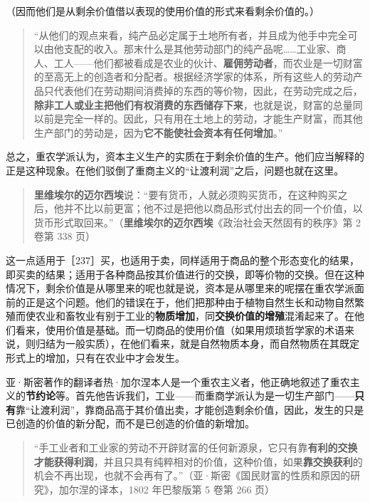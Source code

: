 （因而他们是从剩余价值借以表现的使用价值的形式来看剩余价值的。）

\begin{quote}“从他们的观点来看，纯产品必定属于土地所有者，并且成为他手中完全可以由他支配的收入。那末什么是其他劳动部门的纯产品呢……工业家、商人、工人——他们都被看成是农业的伙计、\textbf{雇佣劳动者}，而农业是一切财富的至高无上的创造者和分配者。根据经济学家的体系，所有这些人的劳动产品只代表他们在劳动期间消费掉的东西的等价物，因此，在劳动完成之后，\textbf{除非工人或业主把他们有权消费的东西储存下来}，也就是说，财富的总量同以前是完全一样的。因此，只有用在土地上的劳动，才能生产财富，而其他生产部门的劳动是，因为\textbf{它不能使社会资本有任何增加}。”\end{quote}

\fontbox{~\{}总之，重农学派认为，资本主义生产的实质在于剩余价值的生产。他们应当解释的正是这种现象。在他们驳倒了重商主义的“让渡利润”之后，问题也就在这里。

\begin{quote}\textbf{里维埃尔的迈尔西埃}说：“要有货币，人就必须购买货币，在这种购买之后，他并不比以前更富；他不过是把他以商品形式付出去的同一个价值，以货币形式取回来。”（\textbf{里维埃尔的迈尔西埃}《政治社会天然固有的秩序》第 2 卷第 338 页）\end{quote}

这一点适用于［237］买，也适用于卖，同样适用于商品的整个形态变化的结果，即买卖的结果；适用于各种商品按其价值进行的交换，即等价物的交换。但在这种情况下，剩余价值是从哪里来的呢也就是说，资本是从哪里来的呢摆在重农学派面前的正是这个问题。他们的错误在于，他们把那种由于植物自然生长和动物自然繁殖而使农业和畜牧业有别于工业的\textbf{物质增加}，同\textbf{交换价值的增殖}混淆起来了。在他们看来，使用价值是基础。而一切商品的使用价值（如果用烦琐哲学家的术语来说，则归结为一般实质），在他们看来，就是自然物质本身，而自然物质在其既定形式上的增加，只有在农业中才会发生。\fontbox{\}~}

亚·斯密著作的翻译者热·加尔涅本人是一个重农主义者，他正确地叙述了重农主义的\textbf{节约论}等。首先他告诉我们，工业——而重商学派认为是一切生产部门——\textbf{只有}靠“让渡利润”，靠商品高于其价值出卖，才能创造剩余价值，因此，发生的只是已创造的价值的新分配，而不是已创造的价值的新增加。

\begin{quote}“手工业者和工业家的劳动不开辟财富的任何新源泉，它只有靠\textbf{有利的交换才能获得利润}，并且只具有纯粹相对的价值，这种价值，如果\textbf{靠交换获利}的机会不再出现，也就不会再有了。”（亚·斯密《国民财富的性质和原因的研究》，加尔涅的译本，1802 年巴黎版第 5 卷第 266 页）\end{quote}

